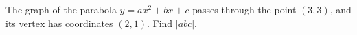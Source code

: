 The graph of the parabola $y=ax^{2}+bx+c$ passes through the point $(3,3)$, and its vertex has coordinates $(2,1)$. Find $|abc|$.
